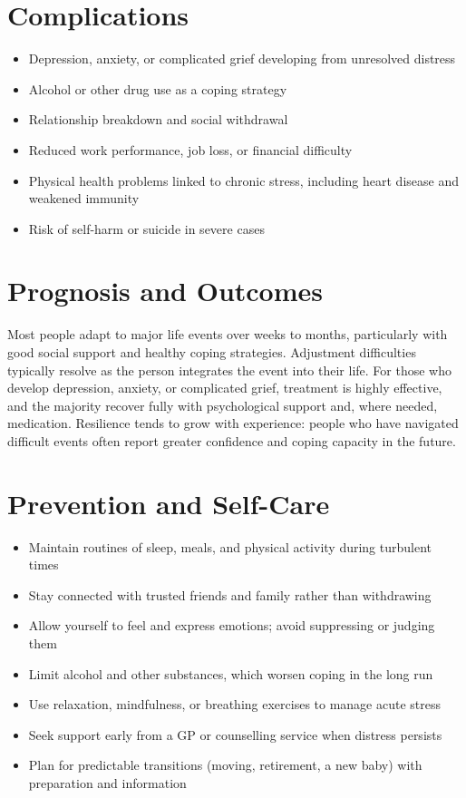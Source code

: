 \section*{Complications}
\begin{itemize}
    \item Depression, anxiety, or complicated grief developing from unresolved distress
    \item Alcohol or other drug use as a coping strategy
    \item Relationship breakdown and social withdrawal
    \item Reduced work performance, job loss, or financial difficulty
    \item Physical health problems linked to chronic stress, including heart disease and weakened immunity
    \item Risk of self-harm or suicide in severe cases
\end{itemize}

\section*{Prognosis and Outcomes}
Most people adapt to major life events over weeks to months, particularly with good social support and healthy coping strategies. Adjustment difficulties typically resolve as the person integrates the event into their life. For those who develop depression, anxiety, or complicated grief, treatment is highly effective, and the majority recover fully with psychological support and, where needed, medication. Resilience tends to grow with experience: people who have navigated difficult events often report greater confidence and coping capacity in the future.

\section*{Prevention and Self-Care}
\begin{itemize}
    \item Maintain routines of sleep, meals, and physical activity during turbulent times
    \item Stay connected with trusted friends and family rather than withdrawing
    \item Allow yourself to feel and express emotions; avoid suppressing or judging them
    \item Limit alcohol and other substances, which worsen coping in the long run
    \item Use relaxation, mindfulness, or breathing exercises to manage acute stress
    \item Seek support early from a GP or counselling service when distress persists
    \item Plan for predictable transitions (moving, retirement, a new baby) with preparation and information
\end{itemize}

